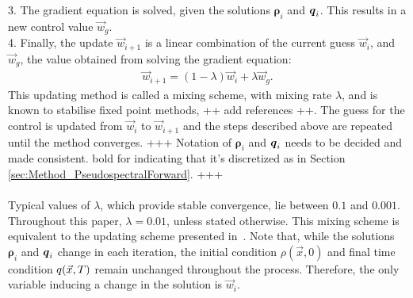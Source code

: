 3. The gradient equation is solved, given the solutions $\boldsymbol\rho_i$ and $\boldsymbol {q}_i$. This results in a new control value $\vec{w}_g$. \\
4. Finally, the update $\vec{w}_{i+1}$ is a linear combination of the current guess $\vec{w}_i$, and $\vec{w}_{g}$, the value obtained from solving the gradient equation:
\begin{align*}
\vec{w}_{i+1} = (1-\lambda)\vec{w}_{i} + \lambda \vec{w}_{g}.
\end{align*}
This updating method is called a mixing scheme, with mixing rate $\lambda$, and is known to stabilise fixed point methods, ++ add references ++.
The guess for the control is updated from $\vec{w}_i$ to $\vec{w}_{i+1}$ and the steps described above are repeated until the method converges. 
+++ Notation of $\boldsymbol \rho_i$ and $\boldsymbol {q}_i$ needs to be decided and made consistent. bold for indicating that it's discretized as in Section \ref{sec:Method_PseudospectralForward}. +++
\\
\\
Typical values of $\lambda$, which provide stable convergence, lie between $0.1$ and $0.001$. Throughout this paper, $\lambda =0.01$, unless stated otherwise. This mixing scheme is equivalent to the updating scheme presented in~\cite{Burger1}. 
Note that, while the solutions $\boldsymbol\rho_i$ and $\boldsymbol {q}_i$ change in each iteration, the initial condition $\rho(\vec{x},0)$ and final time condition $q(\vec{x},T)$ remain unchanged throughout the process. Therefore, the only variable inducing a change in the solution is $\vec{w}_i$.

